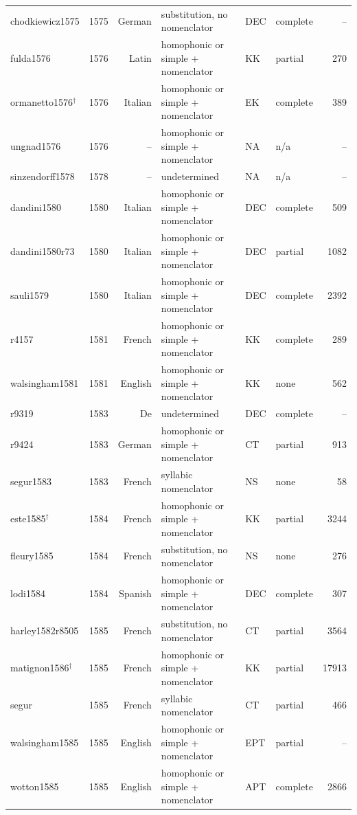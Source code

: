 {\begin{longtable}{@{}llrlllr@{}}
chodkiewicz1575 & 1575 & German & substitution, no nomenclator & DEC & complete & -- \\
fulda1576 & 1576 & Latin & homophonic or simple + nomenclator & KK & partial & 270 \\
ormanetto1576$^\dagger$ & 1576 & Italian & homophonic or simple + nomenclator & EK & complete & 389 \\
ungnad1576 & 1576 & -- & homophonic or simple + nomenclator & NA & n/a & -- \\
sinzendorff1578 & 1578 & -- & undetermined & NA & n/a & -- \\
dandini1580 & 1580 & Italian & homophonic or simple + nomenclator & DEC & complete & 509 \\
dandini1580r73 & 1580 & Italian & homophonic or simple + nomenclator & DEC & partial & 1082 \\
sauli1579 & 1580 & Italian & homophonic or simple + nomenclator & DEC & complete & 2392 \\
r4157 & 1581 & French & homophonic or simple + nomenclator & KK & complete & 289 \\
walsingham1581 & 1581 & English & homophonic or simple + nomenclator & KK & none & 562 \\
r9319 & 1583 & De & undetermined & DEC & complete & -- \\
r9424 & 1583 & German & homophonic or simple + nomenclator & CT & partial & 913 \\
segur1583 & 1583 & French & syllabic nomenclator & NS & none & 58 \\
este1585$^\dagger$ & 1584 & French & homophonic or simple + nomenclator & KK & partial & 3244 \\
fleury1585 & 1584 & French & substitution, no nomenclator & NS & none & 276 \\
lodi1584 & 1584 & Spanish & homophonic or simple + nomenclator & DEC & complete & 307 \\
harley1582r8505 & 1585 & French & substitution, no nomenclator & CT & partial & 3564 \\
matignon1586$^\dagger$ & 1585 & French & homophonic or simple + nomenclator & KK & partial & 17913 \\
segur & 1585 & French & syllabic nomenclator & CT & partial & 466 \\
walsingham1585 & 1585 & English & homophonic or simple + nomenclator & EPT & partial & -- \\
wotton1585 & 1585 & English & homophonic or simple + nomenclator & APT & complete & 2866 \\

\end{longtable}}
